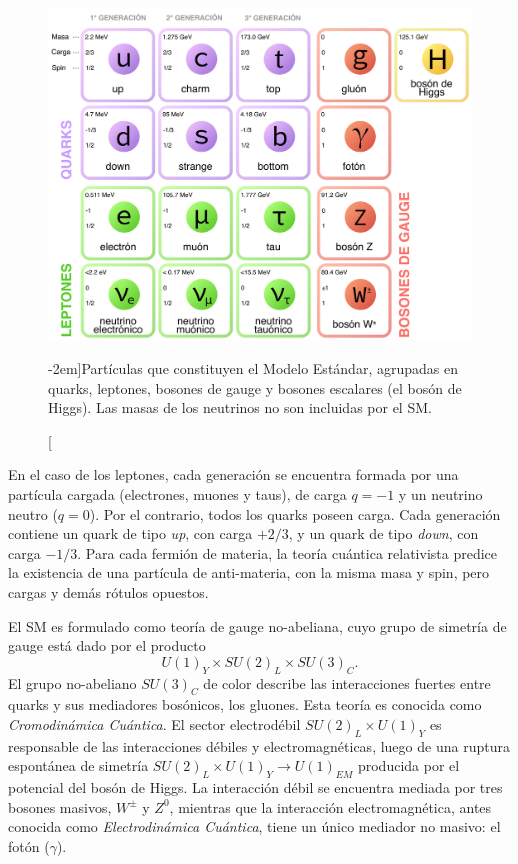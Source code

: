 \begin{figure}[t]
  \includegraphics[width=\linewidth]{Assets/Images/Standard_model.pdf}
  \caption[Partículas que constituyen el Modelo Estándar][-2em]{Partículas que constituyen el Modelo Estándar, agrupadas en quarks, leptones, bosones de gauge y bosones escalares (el bosón de Higgs). Las masas de los neutrinos no son incluidas por el SM.}
  \label{fig:ch1:SM:particles}
\end{figure}

En el caso de los leptones, cada generación se encuentra formada por una partícula cargada (electrones, muones y taus), de carga $q = -1$ y un neutrino neutro ($q = 0$). Por el contrario, todos los quarks poseen carga. Cada generación contiene un quark de tipo \textit{up}, con carga $+2/3$, y un quark de tipo \textit{down}, con carga $-1/3$. Para cada fermión de materia, la teoría cuántica relativista predice la existencia de una partícula de anti-materia, con la misma masa y spin, pero cargas y demás rótulos opuestos.

El SM es formulado como teoría de gauge no-abeliana, cuyo grupo de simetría de gauge está dado por el producto
\[ U(1)_Y \times SU(2)_L \times SU(3)_C. \]
El grupo no-abeliano $SU(3)_C$ de color describe las interacciones fuertes entre quarks y sus mediadores bosónicos, los gluones. Esta teoría es conocida como \textit{Cromodinámica Cuántica}. El sector electrodébil $SU(2)_L \times U(1)_Y$ es responsable de las interacciones débiles y electromagnéticas, luego de una ruptura espontánea de simetría $SU(2)_L \times U(1)_Y \to U(1)_{EM}$ producida por el potencial del bosón de Higgs. La interacción débil se encuentra mediada por tres bosones masivos, $W^\pm$ y $Z^0$, mientras que la interacción electromagnética, antes conocida como \textit{Electrodinámica Cuántica}, tiene un único mediador no masivo: el fotón ($\gamma$).

